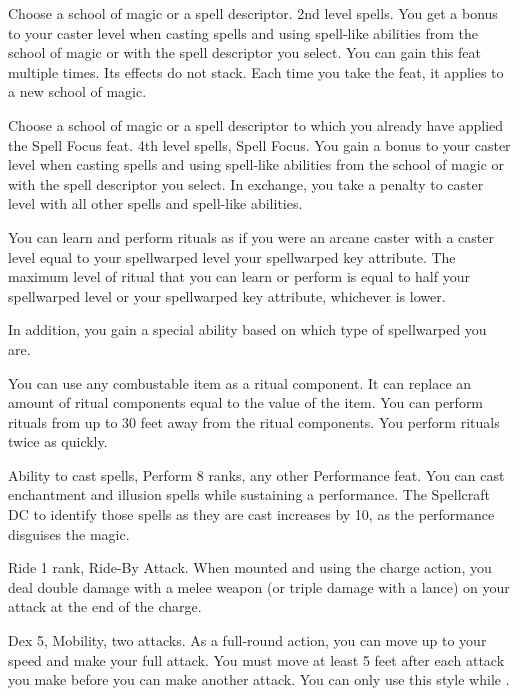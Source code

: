 Choose a school of magic or a spell descriptor.
\featpre 2nd level spells.
\featben You get a  bonus to your caster level when casting spells and using spell-like abilities from the school of magic or with the spell descriptor you select.
You can gain this feat multiple times.
Its effects do not stack.
Each time you take the feat, it applies to a new school of magic.

Choose a school of magic or a spell descriptor to which you already have applied the Spell Focus feat.
\featpres 4th level spells, Spell Focus.
\featben You gain a  bonus to your caster level when casting spells and using spell-like abilities from the school of magic or with the spell descriptor you select.
In exchange, you take a  penalty to caster level with all other spells and spell-like abilities.

\featben You can learn and perform rituals as if you were an arcane caster with a caster level equal to your spellwarped level \add your spellwarped key attribute.
The maximum level of ritual that you can learn or perform is equal to half your spellwarped level or your spellwarped key attribute, whichever is lower.

In addition, you gain a special ability based on which type of spellwarped you are.

 \x
{}
You can use any combustable item as a ritual component.
It can replace an amount of ritual components equal to the value of the item.
You can perform rituals from up to 30 feet away from the ritual components.
You perform rituals twice as quickly.

\featpres Ability to cast spells, Perform 8 ranks, any other Performance feat.
\featben You can cast enchantment and illusion spells while sustaining a performance.
The Spellcraft DC to identify those spells as they are cast increases by 10, as the performance disguises the magic.

\featpres
Ride 1 rank, Ride-By Attack.
\featben When mounted and using the charge action, you deal double damage with a melee weapon (or triple damage with a lance) on your attack at the end of the charge.%

\featpres Dex 5, Mobility, two attacks.
\featben As a full-round action, you can move up to your speed and make your full attack.
You must move at least 5 feet after each attack you make before you can make another attack.
You can only use this style while \unencumbered.


